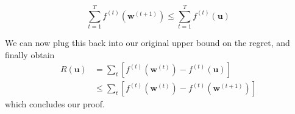 \documentclass[11pt]{article}
\begin{document}
\begin{equation*}
           \sum_{t=1}^{T} f^{(t)} (\boldsymbol{w}^{(t+1)})
       \leq \sum_{t=1}^{T} f^{(t)} (\boldsymbol{u})
\end{equation*}

We can now plug this back into our original upper bound on the regret, and finally obtain
\begin{align*}
        R(\boldsymbol{u})&=\sum_t [f^{(t)}(\boldsymbol{w}^{(t)})-f^{(t)}(\boldsymbol{u})]\\
        &\leq \sum_t [f^{(t)}(\boldsymbol{w}^{(t)})-f^{(t)} (\boldsymbol{w}^{(t+1)})]
\end{align*}
which concludes our proof.
{


}
\end{document}
